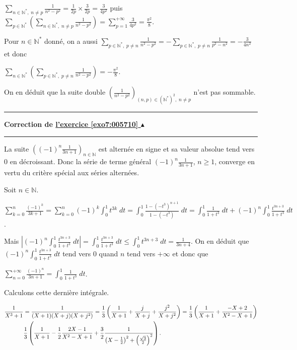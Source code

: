 \documentclass[11pt,a4paper]{article}
\newcommand{\Nn}{\mathbb{N}} \newcommand{\N}{\mathbb{N}}
\newcounter{exo}
\newcommand{\correction}[1]{\hypertarget{cor7:#1}{}\label{cor7:#1}{\bf Correction de \hyperlink{exo7:#1}{l'exercice \ref{exo7:#1} $\blacktriangle$}}\vspace{1mm}\hrule\vspace{1mm}}
\newcommand{\fincorrection}{\vspace{1mm}\hrule\vspace*{7mm}}
\begin{document}
\begin{center}
$\sum_{n\in\Nn^*,\;n\neq p}^{}\frac{1}{n^2-p^2}=\frac{1}{2p}\times\frac{3}{2p}=\frac{3}{4p^2}$ puis $\sum_{p\in\Nn^*}^{}\left(\sum_{n\in\Nn^*,\;n\neq p}^{}\frac{1}{n^2-p^2}\right)=\sum_{p=1}^{+\infty}\frac{3}{4p^2}=\frac{\pi^2}{8}$.
\end{center}

Pour $n\in\Nn^*$ donné, on a aussi $\sum_{p\in\Nn^*,\;p\neq n}^{}\frac{1}{n^2-p^2}=-\sum_{p\in\Nn^*,\;p\neq n}^{}\frac{1}{p^2-n^2}=-\frac{3}{4n^2}$ et donc

\begin{center}
$\sum_{n\in\Nn^*}^{}\left(\sum_{p\in\Nn^*,\;p\neq n}^{}\frac{1}{n^2-p^2}\right)=-\frac{\pi^2}{8}$.
\end{center}

On en déduit que la suite double $\left(\frac{1}{n^2-p^2}\right)_{(n,p)\in(\Nn^*)^2,\;n\neq p}$ n'est pas sommable.
\fincorrection
\correction{005710}
La suite $\left((-1)^n\frac{1}{3n+1}\right)_{n\in\Nn}$ est alternée en signe et sa valeur absolue tend vers $0$ en décroissant. Donc la série de terme général $(-1)^n\frac{1}{3n+1}$, $n\geqslant 1$, converge en vertu du critère spécial aux séries alternées.

Soit $n\in\Nn$.

\begin{center}
$\sum_{k=0}^{n}\frac{(-1)^k}{3k+1}=\sum_{k=0}^{n}(-1)^k\int_{0}^{1}t^{3k}\;dt=\int_{0}^{1}\frac{1-(-t^3)^{n+1}}{1-(-t^3)}\;dt=\int_{0}^{1}\frac{1}{1+t^3}\;dt+(-1)^n\int_{0}^{1}\frac{t^{3n+3}}{1+t^3}\;dt$.
\end{center}

Mais $\left|(-1)^n\int_{0}^{1}\frac{t^{3n+3}}{1+t^3}\;dt\right|=\int_{0}^{1}\frac{t^{3n+3}}{1+t^3}\;dt\leqslant\int_{0}^{1}t^{3n+3}\;dt=\frac{1}{3n+4}$. On en déduit que $(-1)^n\int_{0}^{1}\frac{t^{3n+3}}{1+t^3}\;dt$ tend vers $0$ quand $n$ tend vers $+\infty$ et donc que

\begin{center}
$\sum_{n=0}^{+\infty}\frac{(-1)^n}{3n+1}=\int_{0}^{1}\frac{1}{1+t^3}\;dt$.
\end{center}

Calculons cette dernière intégrale.

\begin{align*}\ensuremath
\frac{1}{X^3+1}&=\frac{1}{(X+1)(X+j)(X+j^2)}=\frac{1}{3}\left(\frac{1}{X+1}+\frac{j}{X+j}+\frac{j^2}{X+j^2}\right)=\frac{1}{3}\left(\frac{1}{X+1}+\frac{-X+2}{X^2-X+1}\right)\\
 &\frac{1}{3}\left(\frac{1}{X+1}-\frac{1}{2}\frac{2X-1}{X^2-X+1}+
 \frac{3}{2}\frac{1}{\left(X-\frac{1}{2}\right)^2+\left(\frac{\sqrt{3}}{2}\right)^2}
 \right).
\end{align*}
\end{document}
